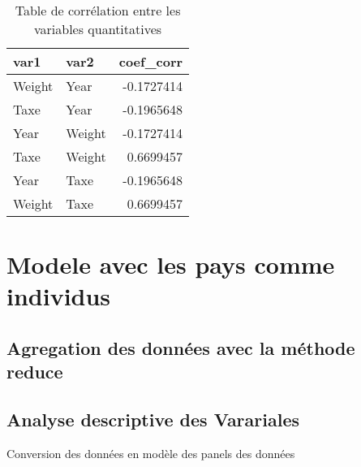 \documentclass[
]{book}
\begin{document}
\begin{table}

\caption{\label{tab:unnamed-chunk-40}Table de corrélation entre les variables quantitatives}
\centering
\begin{tabular}[t]{l|l|r}
\hline
var1 & var2 & coef\_corr\\
\hline
Weight & Year & -0.1727414\\
\hline
Taxe & Year & -0.1965648\\
\hline
Year & Weight & -0.1727414\\
\hline
Taxe & Weight & 0.6699457\\
\hline
Year & Taxe & -0.1965648\\
\hline
Weight & Taxe & 0.6699457\\
\hline
\end{tabular}
\end{table}

\hypertarget{modele-avec-les-pays-comme-individus}{%
\chapter{Modele avec les pays comme individus}\label{modele-avec-les-pays-comme-individus}}

\hypertarget{agregation-des-donnuxe9es-avec-la-muxe9thode-reduce}{%
\section{Agregation des données avec la méthode reduce}\label{agregation-des-donnuxe9es-avec-la-muxe9thode-reduce}}

\hypertarget{analyse-descriptive-des-varariales}{%
\section{Analyse descriptive des Varariales}\label{analyse-descriptive-des-varariales}}

Conversion des données en modèle des panels des données
\end{document}
